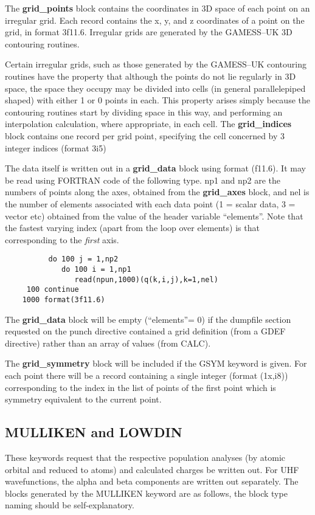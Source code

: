 \documentclass[11pt,fleqn]{article}
\begin{document}
The {\bf grid\_points} block contains the coordinates in 3D space
of each point on an irregular grid. Each record contains the
x, y, and z coordinates of a point on the grid, in  format 3f11.6.
Irregular grids are generated by the GAMESS--UK 3D contouring routines.

Certain irregular grids, such as those generated by the GAMESS--UK contouring routines 
have the property that although the points do not lie regularly in 
3D space, the space they occupy may be divided into 
cells (in general parallelepiped shaped) with either 1 or 0 
points in each. This property arises simply because the 
contouring routines start by dividing space in this way, and
performing an interpolation calculation, where appropriate, in each cell.
The {\bf grid\_indices} block contains one record per grid point,
specifying the cell concerned by 3 integer indices (format 3i5)

The data itself is written out in a {\bf grid\_data} block using format (f11.6). 
It may be read using
FORTRAN code of the following type. np1 and np2 are the numbers of points along the
axes, obtained from the {\bf grid\_axes} block, and nel is
the number of elements associated with each data point (1 = scalar data, 3 = vector etc) obtained
from the value of the header variable ``elements''.
Note that the fastest varying index (apart from the loop over elements) 
is that corresponding to the {\em first} axis.

{
\footnotesize
\begin{verbatim}
          do 100 j = 1,np2
             do 100 i = 1,np1
                read(npun,1000)(q(k,i,j),k=1,nel)
     100 continue
    1000 format(3f11.6)
\end{verbatim}
}

The {\bf grid\_data} block will be empty (``elements''= 0) if the dumpfile
section requested on the punch directive contained a grid definition (from
a GDEF directive) rather than an array of values (from CALC).

The {\bf grid\_symmetry} block will be included if the GSYM keyword is
given. For each point there will be a record containing a single integer 
(format (1x,i8)) corresponding to the index in the list of points of the
first point which is symmetry equivalent to the current point.

\subsection[MULLIKEN and LOWDIN]{MULLIKEN and LOWDIN}
These keywords request that the respective population analyses
(by atomic orbital and  reduced to atoms) and calculated charges
be written out. For UHF wavefunctions, the alpha and beta components
are written out separately. The blocks generated by the MULLIKEN keyword
are as follows, the block type naming should be self-explanatory.
\end{document}
